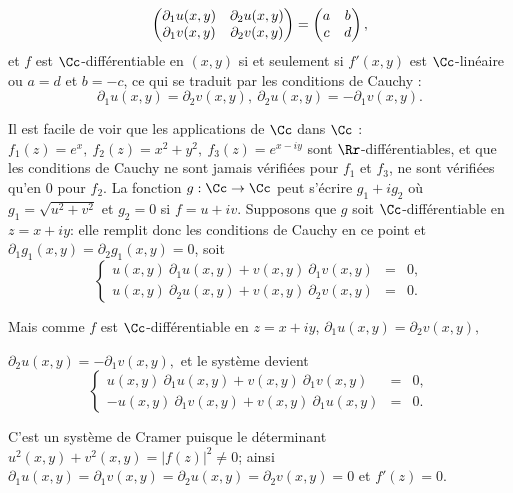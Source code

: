 {\begin{enumerate}
{$$\begin{pmatrix}\partial_1u(x,y)&\partial_2u(x,y)\cr \partial_1v(x,y)&
\partial_2v(x,y) \cr \end{pmatrix}=\begin{pmatrix}a&b\cr c&d \cr \end{pmatrix},$$ et $f$ est  
$\Cc$-différentiable en
$(x,y)$ 
si et seulement si $f'(x,y)$ est $\Cc$-linéaire ou  $a=d$ et $b=-c$, ce qui se
traduit par les conditions de Cauchy : 
$$\partial_1u(x,y)=\partial_2v(x,y),\ \partial_2u(x,y)=-\partial_1v(x,y).$$

Il est facile de voir que les applications de $\Cc$ dans
$\Cc$ : $f_1(z)=e^x,\ f_2(z)= x^2+y^2,\ f_3(z)=e^{x-iy}$ sont 
$\Rr$-différentiables, et que les conditions de Cauchy ne sont jamais vérifiées
pour $f_1$ et $f_3$, ne sont vérifiées qu'en $0$ pour $f_2$.
La fonction $g :\Cc\to\Cc$ peut s'écrire $g_1+ig_2$ où
$g_1=\sqrt{u^2+v^2}$ et $g_2=0$ si
$f=u+iv$. Supposons que $g$ soit 
$\Cc$-différentiable en $z=x+iy$: elle remplit donc les conditions de
Cauchy en ce point et $\partial_1g_1(x,y)=\partial_2g_1(x,y)=0$, soit
$$\left \{\begin{array}{ccc}
u(x,y)\ \partial_1u(x,y)+v(x,y)\ \partial_1v(x,y)&=&0,\\
u(x,y)\ \partial_2u(x,y)+v(x,y)\ \partial_2v(x,y)&=&0.
\end{array}\right.
$$

Mais comme $f$ est  
$\Cc$-différentiable en $z=x+iy$, $\partial_1u(x,y)=\partial_2v(x,y),$ 
 
$\partial_2u(x,y)=-\partial_1v(x,y),$ et le système devient
$$\left \{\begin{array}{ccc}
u(x,y)\ \partial_1u(x,y)+v(x,y)\ \partial_1v(x,y)&=&0,\\
-u(x,y)\ \partial_1v(x,y)+v(x,y)\ \partial_1u(x,y)&=&0.
\end{array}\right.
$$

C'est un système de Cramer puisque le déterminant
$u^2(x,y)+v^2(x,y)=|f(z)|^2\not=0$;
ainsi $\partial_1u(x,y)=\partial_1v(x,y)=\partial_2u(x,y)=\partial_2v(x,y)=0$ et
$f'(z)=0$.
}
\end{enumerate}
}
